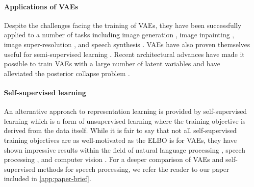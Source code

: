 \paragraph{Applications of VAEs}
Despite the challenges facing the training of VAEs, they have been successfully applied to a number of tasks including image generation \cite{kingma_autoencoding_2014,rezende_stochastic_2014}, image inpainting \cite{pathak_context_2016}, image super-resolution \cite{sonderby_amortised_2017,chira_image_2022}, and speech synthesis \cite{hsu_unsupervised_2017,hsu_hierarchical_2019}. 
VAEs have also proven themselves useful for semi-supervised learning \cite{kingma_semi-supervised_2014,kingma_improved_2016,maaloe_biva_2019}. Recent architectural advances have made it possible to train VAEs with a large number of latent variables \cite{sonderby_ladder_2016,vahdat_nvae_2020,child_very_2021} and have alleviated the posterior collapse problem \cite{maaloe_biva_2019}.


\paragraph{Self-supervised learning}
An alternative approach to representation learning is provided by self-supervised learning \cite{mikolov_efficient_2013,devlin_bert_2018,chen_simple_2020,schneider_wav2vec_2019} which is a form of unsupervised learning where the training objective is derived from the data itself. 
While it is fair to say that not all self-supervised training objectives are as well-motivated as the ELBO is for VAEs, they have shown impressive results within the field of natural language processing \cite{devlin_bert_2018,chen_simple_2020}, speech processing \cite{schneider_wav2vec_2019}, and computer vision \cite{chen_simple_2020}. 
For a deeper comparison of VAEs and self-supervised methods for speech processing, we refer the reader to our paper \textcite{borgholt_brief_2022} included in \cref{app:paper-brief}. 

